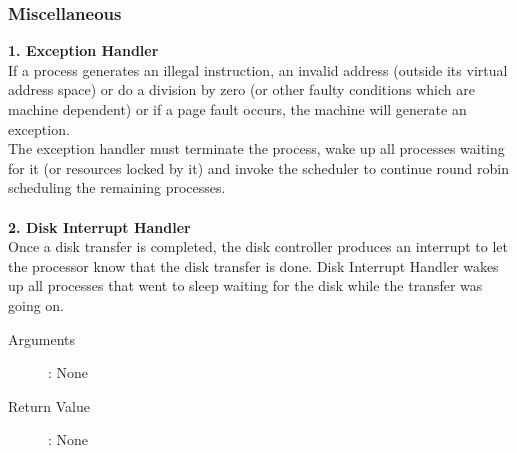 \documentclass[11pt ,twosided]{article}
\begin{document}
\subsubsection{Miscellaneous}
\textbf{1. Exception Handler}
\\
If a process generates an illegal instruction, an invalid address (outside its virtual address space) or do a division by zero (or other faulty conditions which are machine dependent) or if a page fault occurs, the machine will generate an exception. 
\\
The exception handler must terminate the process, wake up all processes waiting for it (or resources locked by it) and invoke the scheduler to continue round robin scheduling the remaining processes.
\\ \\
\textbf{2. Disk Interrupt Handler}
\\ 
Once a disk transfer is completed, the disk controller produces an interrupt to let the processor know that the disk transfer is done. Disk Interrupt Handler wakes up all processes that went to sleep waiting for the disk while the transfer was going on. 
\iffalse
\begin{description}
\item[Arguments]: None
\item[Return Value]: None
\end{description} 
\end{document}
